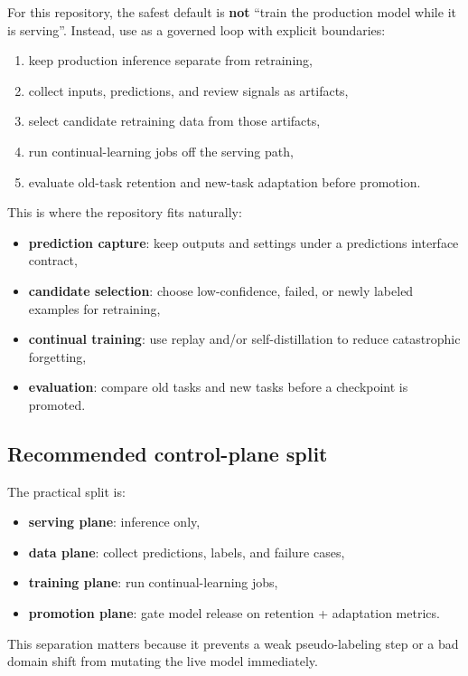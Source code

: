 For this repository, the safest default is \textbf{not} ``train the production model while it is serving''.
Instead, use \yolozu{} as a governed loop with explicit boundaries:
\begin{enumerate}
  \item keep production inference separate from retraining,
  \item collect inputs, predictions, and review signals as artifacts,
  \item select candidate retraining data from those artifacts,
  \item run continual-learning jobs off the serving path,
  \item evaluate old-task retention and new-task adaptation before promotion.
\end{enumerate}

This is where the repository fits naturally:
\begin{itemize}
  \item \textbf{prediction capture}: keep outputs and settings under a predictions interface contract,
  \item \textbf{candidate selection}: choose low-confidence, failed, or newly labeled examples for retraining,
  \item \textbf{continual training}: use replay and/or self-distillation to reduce catastrophic forgetting,
  \item \textbf{evaluation}: compare old tasks and new tasks before a checkpoint is promoted.
\end{itemize}

\subsection{Recommended control-plane split}

The practical split is:
\begin{itemize}
  \item \textbf{serving plane}: inference only,
  \item \textbf{data plane}: collect predictions, labels, and failure cases,
  \item \textbf{training plane}: run continual-learning jobs,
  \item \textbf{promotion plane}: gate model release on retention + adaptation metrics.
\end{itemize}

This separation matters because it prevents a weak pseudo-labeling step or a bad domain shift from mutating the live model immediately.

